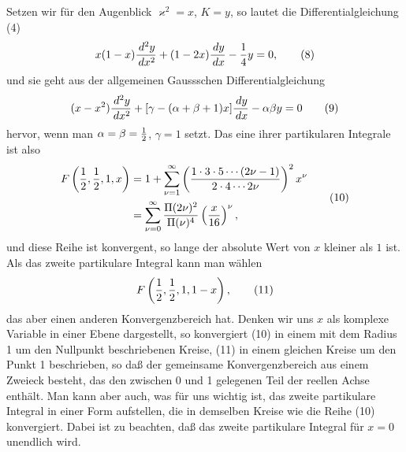 \documentclass[11pt]{article}
\providecommand{\dd}{\,d}
\begin{document}
Setzen wir für den Augenblick $\varkappa^2=x$, $K=y$, so lautet die Differentialgleichung (4)
\begin{equation}
x(1-x){\dd^2y\over\dd x^2}+(1-2x){\dd y\over\dd x}-{1\over4}y=0,
\tag{8}
\end{equation}
und sie geht aus der allgemeinen Gaussschen Differentialgleichung
\begin{equation}
(x-x^2){\dd^2y\over\dd x^2}+[\gamma-(\alpha+\beta+1)x]{\dd y\over\dd x}-\alpha\beta y=0
\tag{9}
\end{equation}
hervor, wenn man $\alpha=\beta={1\over2}$, $\gamma=1$ setzt. Das eine ihrer partikularen Integrale ist also
\begin{equation}
\begin{aligned}
F\left({1\over2},{1\over2},1,x\right)
&=1+\sum_{\nu=1}^{\infty}\left({1\cdot3\cdot5\cdots(2\nu-1)\over2\cdot4\cdots2\nu}\right)^2x^\nu\\
&=\sum_{\nu=0}^{\infty}{\Pi(2\nu)^2\over\Pi(\nu)^4}\left({x\over16}\right)^\nu,
\end{aligned}
\tag{10}
\end{equation}
und diese Reihe ist konvergent, so lange der absolute Wert von $x$ kleiner als $1$ ist. Als das zweite partikulare Integral kann man wählen
\begin{equation}
F\left({1\over2},{1\over2},1,1-x\right),
\tag{11}
\end{equation}
das aber einen anderen Konvergenzbereich hat. Denken wir uns $x$ als komplexe Variable in einer Ebene dargestellt, so konvergiert (10) in einem mit dem Radius 1 um den Nullpunkt beschriebenen Kreise, (11) in einem gleichen Kreise um den Punkt 1 beschrieben, so daß der gemeinsame Konvergenzbereich aus einem Zweieck besteht, das den zwischen 0 und 1 gelegenen Teil der reellen Achse enthält. Man kann aber auch, was für uns wichtig ist, das zweite partikulare Integral in einer Form aufstellen, die in demselben Kreise wie die Reihe (10) konvergiert. Dabei ist zu beachten, daß das zweite partikulare Integral für $x=0$ unendlich wird.
\end{document}
